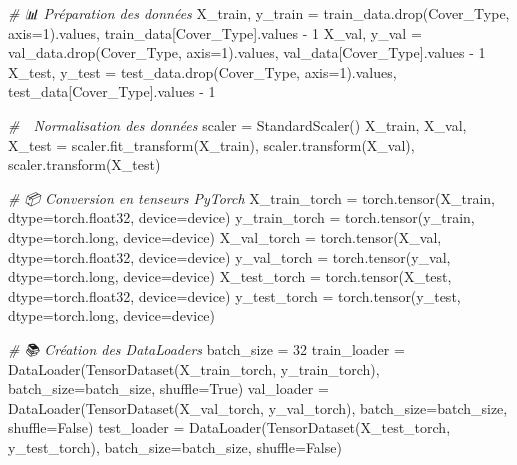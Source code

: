 \documentclass[
]{article}
\newenvironment{Shaded}{}{}
\newcommand{\BuiltInTok}[1]{\textcolor[rgb]{0.00,0.50,0.00}{#1}}
\newcommand{\CommentTok}[1]{\textcolor[rgb]{0.38,0.63,0.69}{\textit{#1}}}
\newcommand{\DecValTok}[1]{\textcolor[rgb]{0.25,0.63,0.44}{#1}}
\newcommand{\NormalTok}[1]{#1}
\newcommand{\OperatorTok}[1]{\textcolor[rgb]{0.40,0.40,0.40}{#1}}
\newcommand{\StringTok}[1]{\textcolor[rgb]{0.25,0.44,0.63}{#1}}
\newcommand{\VariableTok}[1]{\textcolor[rgb]{0.10,0.09,0.49}{#1}}
\begin{document}
\begin{Shaded}
\begin{Highlighting}[]
\CommentTok{\# 📊 Préparation des données}
\NormalTok{X\_train, y\_train }\OperatorTok{=}\NormalTok{ train\_data.drop(}\StringTok{\textquotesingle{}Cover\_Type\textquotesingle{}}\NormalTok{, axis}\OperatorTok{=}\DecValTok{1}\NormalTok{).values, train\_data[}\StringTok{\textquotesingle{}Cover\_Type\textquotesingle{}}\NormalTok{].values }\OperatorTok{{-}} \DecValTok{1}
\NormalTok{X\_val, y\_val }\OperatorTok{=}\NormalTok{ val\_data.drop(}\StringTok{\textquotesingle{}Cover\_Type\textquotesingle{}}\NormalTok{, axis}\OperatorTok{=}\DecValTok{1}\NormalTok{).values, val\_data[}\StringTok{\textquotesingle{}Cover\_Type\textquotesingle{}}\NormalTok{].values }\OperatorTok{{-}} \DecValTok{1}
\NormalTok{X\_test, y\_test }\OperatorTok{=}\NormalTok{ test\_data.drop(}\StringTok{\textquotesingle{}Cover\_Type\textquotesingle{}}\NormalTok{, axis}\OperatorTok{=}\DecValTok{1}\NormalTok{).values, test\_data[}\StringTok{\textquotesingle{}Cover\_Type\textquotesingle{}}\NormalTok{].values }\OperatorTok{{-}} \DecValTok{1}

\CommentTok{\# 🔢 Normalisation des données}
\NormalTok{scaler }\OperatorTok{=}\NormalTok{ StandardScaler()}
\NormalTok{X\_train, X\_val, X\_test }\OperatorTok{=}\NormalTok{ scaler.fit\_transform(X\_train), scaler.transform(X\_val), scaler.transform(X\_test)}

\CommentTok{\# 📦 Conversion en tenseurs PyTorch}
\NormalTok{X\_train\_torch }\OperatorTok{=}\NormalTok{ torch.tensor(X\_train, dtype}\OperatorTok{=}\NormalTok{torch.float32, device}\OperatorTok{=}\NormalTok{device)}
\NormalTok{y\_train\_torch }\OperatorTok{=}\NormalTok{ torch.tensor(y\_train, dtype}\OperatorTok{=}\NormalTok{torch.}\BuiltInTok{long}\NormalTok{, device}\OperatorTok{=}\NormalTok{device)}
\NormalTok{X\_val\_torch }\OperatorTok{=}\NormalTok{ torch.tensor(X\_val, dtype}\OperatorTok{=}\NormalTok{torch.float32, device}\OperatorTok{=}\NormalTok{device)}
\NormalTok{y\_val\_torch }\OperatorTok{=}\NormalTok{ torch.tensor(y\_val, dtype}\OperatorTok{=}\NormalTok{torch.}\BuiltInTok{long}\NormalTok{, device}\OperatorTok{=}\NormalTok{device)}
\NormalTok{X\_test\_torch }\OperatorTok{=}\NormalTok{ torch.tensor(X\_test, dtype}\OperatorTok{=}\NormalTok{torch.float32, device}\OperatorTok{=}\NormalTok{device)}
\NormalTok{y\_test\_torch }\OperatorTok{=}\NormalTok{ torch.tensor(y\_test, dtype}\OperatorTok{=}\NormalTok{torch.}\BuiltInTok{long}\NormalTok{, device}\OperatorTok{=}\NormalTok{device)}

\CommentTok{\# 📚 Création des DataLoaders}
\NormalTok{batch\_size }\OperatorTok{=} \DecValTok{32}
\NormalTok{train\_loader }\OperatorTok{=}\NormalTok{ DataLoader(TensorDataset(X\_train\_torch, y\_train\_torch), batch\_size}\OperatorTok{=}\NormalTok{batch\_size, shuffle}\OperatorTok{=}\VariableTok{True}\NormalTok{)}
\NormalTok{val\_loader }\OperatorTok{=}\NormalTok{ DataLoader(TensorDataset(X\_val\_torch, y\_val\_torch), batch\_size}\OperatorTok{=}\NormalTok{batch\_size, shuffle}\OperatorTok{=}\VariableTok{False}\NormalTok{)}
\NormalTok{test\_loader }\OperatorTok{=}\NormalTok{ DataLoader(TensorDataset(X\_test\_torch, y\_test\_torch), batch\_size}\OperatorTok{=}\NormalTok{batch\_size, shuffle}\OperatorTok{=}\VariableTok{False}\NormalTok{)}


\end{Highlighting}
\end{Shaded}
\end{document}
